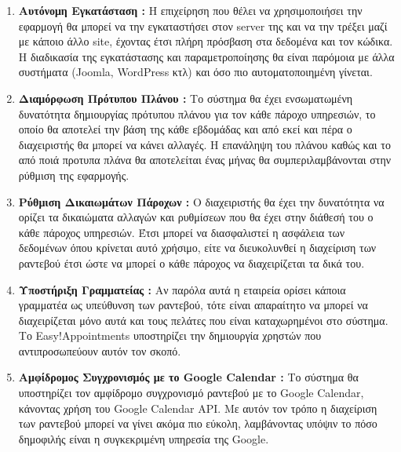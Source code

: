 \begin{enumerate}
\item {\bf Αυτόνομη Εγκατάσταση :} Η επιχείρηση που θέλει να χρησιμοποιήσει την εφαρμογή θα μπορεί να την εγκαταστήσει στον server της και να την τρέξει μαζί με κάποιο άλλο site, έχοντας έτσι πλήρη πρόσβαση στα δεδομένα και τον κώδικα. Η διαδικασία της εγκατάστασης και παραμετροποίησης θα είναι παρόμοια με άλλα συστήματα (Joomla, WordPress κτλ) και όσο πιο αυτοματοποιημένη γίνεται.

\item {\bf Διαμόρφωση Πρότυπου Πλάνου :} Το σύστημα θα έχει ενσωματωμένη δυνατότητα δημιουργίας πρότυπου πλάνου για τον κάθε πάροχο υπηρεσιών, το οποίο θα αποτελεί την βάση της κάθε εβδομάδας και από εκεί και πέρα ο διαχειριστής θα μπορεί να κάνει αλλαγές. Η επανάληψη του πλάνου καθώς και το από ποιά προτυπα πλάνα θα αποτελείται ένας μήνας θα συμπεριλαμβάνονται στην ρύθμιση της εφαρμογής.

\item {\bf Ρύθμιση Δικαιωμάτων Πάροχων :} Ο διαχειριστής θα έχει την δυνατότητα να ορίζει τα δικαιώματα αλλαγών και ρυθμίσεων που θα έχει στην διάθεσή του ο κάθε πάροχος υπηρεσιών. Έτσι μπορεί να διασφαλιστεί η ασφάλεια των δεδομένων όπου κρίνεται αυτό χρήσιμο, είτε να διευκολυνθεί η διαχείριση των ραντεβού έτσι ώστε να μπορεί ο κάθε πάροχος να διαχειρίζεται τα δικά του.

\item {\bf Υποστήριξη Γραμματείας :} Αν παρόλα αυτά η εταιρεία ορίσει κάποια γραμματέα ως υπεύθυνση των ραντεβού, τότε είναι απαραίτητο να μπορεί να διαχειρίζεται μόνο αυτά και τους πελάτες που είναι καταχωρημένοι στο σύστημα. Το Easy!Appointments υποστηρίζει την δημιουργία χρηστών που αντιπροσωπεύουν αυτόν τον σκοπό.

\item {\bf Αμφίδρομος Συγχρονισμός με το Google Calendar :} Το σύστημα θα υποστηρίζει τον αμφίδρομο συγχρονισμό ραντεβού με το Google Calendar, κάνοντας χρήση του Google Calendar API. Με αυτόν τον τρόπο η διαχείριση των ραντεβού μπορεί να γίνει ακόμα πιο εύκολη, λαμβάνοντας υπόψιν το πόσο δημοφιλής είναι η συγκεκριμένη υπηρεσία της Google.
\end{enumerate}

